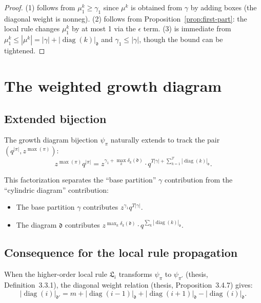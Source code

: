 \documentclass[11pt]{article}
\newcommand{\diag}{\operatorname{diag}}
\begin{document}
\begin{proof}
(1) follows from $\mu^k_1 \geq \gamma_1$ since $\mu^k$ is obtained from $\gamma$
by adding boxes (the diagonal weight is nonneg).
(2) follows from Proposition~\ref{prop:first-part}: the local rule changes
$\mu^k_1$ by at most 1 via the $\epsilon$ term.
(3) is immediate from $\mu^k_1 \leq |\mu^k| = |\gamma| + |\diag(k)|_\mathfrak{d}$
and $\gamma_1 \leq |\gamma|$, though the bound can be tightened.
\end{proof}


\section{The weighted growth diagram}
\label{sec:weighted-growth}

\subsection{Extended bijection}

The growth diagram bijection $\psi_\pi$ naturally extends to track the pair
$(q^{|\pi|}, z^{\max(\pi)})$:
\[
  z^{\max(\pi)} q^{|\pi|}
  = z^{\gamma_1 + \max_k \delta_k(\mathfrak{d})} \cdot
    q^{T|\gamma| + \sum_{k=1}^T |\diag(k)|_{\mathfrak{d}}}.
\]

This factorization separates the ``base partition'' $\gamma$ contribution
from the ``cylindric diagram'' contribution:
\begin{itemize}
  \item The base partition $\gamma$ contributes $z^{\gamma_1} q^{T|\gamma|}$.
  \item The diagram $\mathfrak{d}$ contributes
    $z^{\max_k \delta_k(\mathfrak{d})} \cdot q^{\sum_k |\diag(k)|_\mathfrak{d}}$.
\end{itemize}

\subsection{Consequence for the local rule propagation}

When the higher-order local rule $\mathfrak{L}_i$ transforms $\psi_\pi$ to
$\psi_{\pi'}$ (thesis, Definition~3.3.1), the diagonal weight relation
(thesis, Proposition~3.4.7) gives:
\[
  |\diag(i)|_{\mathfrak{d}'} = m + |\diag(i-1)|_{\mathfrak{d}} + |\diag(i+1)|_{\mathfrak{d}}
  - |\diag(i)|_{\mathfrak{d}}.
\]
\end{document}

